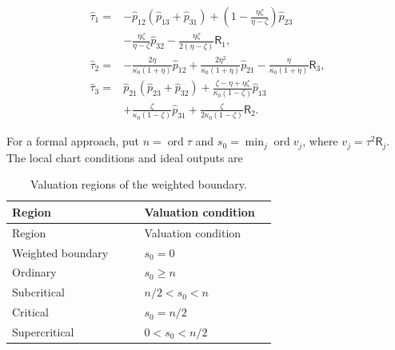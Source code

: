 \begin{equation}\label{supp:r3:RRreconstruction}
\begin{aligned}
\widehat\tau_1={}&-\widehat p_{12}(\widehat p_{13}+\widehat p_{31})
 +\left(1-\frac{\eta \zeta }{\eta -\zeta }\right)\widehat p_{23}\\
 &-\frac{\eta \zeta }{\eta -\zeta }\widehat p_{32}-\frac{\eta \zeta }{2(\eta -\zeta )}\mathsf R_1,\\
\widehat\tau_2={}&-\frac{2\eta }{\kappa_0 (1+\eta )}\widehat p_{12}
 +\frac{2\eta ^2}{\kappa_0 (1+\eta )}\widehat p_{21}-\frac{\eta }{\kappa_0 (1+\eta )}\mathsf R_3,\\
\widehat\tau_3={}&\widehat p_{21}(\widehat p_{23}+\widehat p_{32})
 +\frac{\zeta -\eta +\eta \zeta }{\kappa_0 (1-\zeta )}\widehat p_{13}\\
 &+\frac{\zeta }{\kappa_0 (1-\zeta )}\widehat p_{31}+\frac{\zeta }{2\kappa_0 (1-\zeta )}\mathsf R_2.
\end{aligned}
\end{equation}

For a formal approach, put $n=\operatorname{ord}\tau$ and
$s_0=\min_j\operatorname{ord}v_j$, where $v_j=\tau^2\mathsf R_j$.
The local chart conditions and ideal outputs are

\begin{longtable}{@{}>{\raggedright\arraybackslash}p{0.46\linewidth}>{\raggedright\arraybackslash}p{0.46\linewidth}@{}}
\caption{Valuation regions of the weighted boundary.}\label{supp:tab:r3-valuations}\\
\toprule Region & Valuation condition\\\midrule\endfirsthead
\toprule Region & Valuation condition\\\midrule\endhead
Weighted boundary & $s_0=0$\\
Ordinary & $s_0\ge n$\\
Subcritical & $n/2<s_0<n$\\
Critical & $s_0=n/2$\\
Supercritical & $0<s_0<n/2$\\
\bottomrule\end{longtable}

